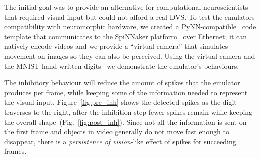 \documentclass[conference]{IEEEtran}
\begin{document}
The initial goal was to provide an alternative for computational neuroscientists that required visual input but could not afford a real DVS. To test the emulators compatibility with neuromorphic hardware, we created a PyNN-compatible~\cite{pynn} code template that communicates to the SpiNNaker platform~\cite{spinnakerOverview} over Ethernet; it can natively encode videos and we provide a ``virtual camera'' that simulates movement on images so they can also be perceived. Using the virtual camera and the MNIST hand-written digits~\cite{mnist} we demonstrate the emulator's behaviours.



The inhibitory behaviour will reduce the amount of spikes that the emulator produces per frame, while keeping some of the information needed to represent the visual input. Figure~\ref{fig:pre_inh} shows the detected spikes as the digit traverses to the right, after the inhibition step fewer spikes remain while keeping the overall shape~(Fig.~\ref{fig:post_inh}). Since not all the information is sent on the first frame and objects in video generally do not move fast enough to disappear, there is a \textit{persistence of vision}-like effect of spikes for succeeding frames.
\end{document}
